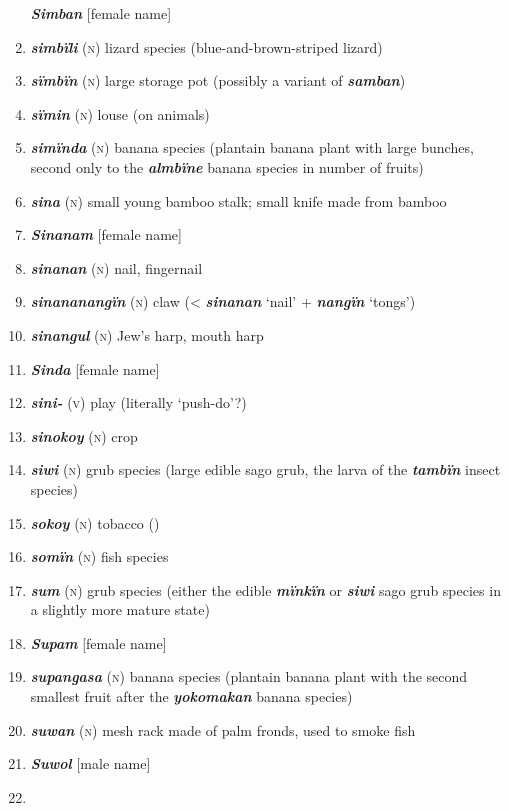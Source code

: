 \begin{enumerate}[noitemsep, label={}, align=left, widest=190, labelsep=1ex,leftmargin=*,itemindent=-10pt]
\textbf{\textit{Simban}} [female name] \item 
\textbf{\textit{simbïli}} (\textsc{n}) lizard species (blue-and-brown-striped lizard) \item 
\textbf{\textit{sïmbïn}} (\textsc{n}) large storage pot (possibly a variant of \textbf{\textit{samban}}) \item 
\textbf{\textit{sïmin}} (\textsc{n}) louse (on animals) \item 
\textbf{\textit{simïnda}} (\textsc{n}) banana species (plantain banana plant with large bunches, second only to the \textbf{\textit{almbïne}} banana species in number of fruits) \item 
\textbf{\textit{sina}} (\textsc{n}) small young bamboo stalk; small knife made from bamboo \item 
\textbf{\textit{Sinanam}} [female name] \item 
\textbf{\textit{sinanan}} (\textsc{n}) nail, fingernail \item 
\textbf{\textit{sinananangïn}} (\textsc{n}) claw (< \textbf{\textit{sinanan}} ‘nail’ + \textbf{\textit{nangïn}} ‘tongs’) \item 
\textbf{\textit{sinangul}} (\textsc{n}) Jew’s harp, mouth harp \item 
\textbf{\textit{Sinda}} [female name] \item 
\textbf{\textit{sini-}} (\textsc{v}) play (literally ‘push-do’?) \item 
\textbf{\textit{sinokoy}} (\textsc{n}) crop \item 
\textbf{\textit{siwi}} (\textsc{n}) grub species (large edible sago grub, the larva of the \textbf{\textit{tambïn}} insect species) \item 
\textbf{\textit{sokoy}} (\textsc{n}) tobacco () \item 
\textbf{\textit{somïn}} (\textsc{n}) fish species \item 
\textbf{\textit{sum}} (\textsc{n}) grub species (either the edible \textbf{\textit{mïnkïn}} or \textbf{\textit{siwi}} sago grub species in a slightly more mature state) \item 
\textbf{\textit{Supam}} [female name] \item 
\textbf{\textit{supangasa}} (\textsc{n}) banana species (plantain banana plant with the second smallest fruit after the \textbf{\textit{yokomakan}} banana species) \item 
\textbf{\textit{suwan}} (\textsc{n}) mesh rack made of palm fronds, used to smoke fish \item 
\textbf{\textit{Suwol}} [male name]\\ \item 


\end{enumerate}
